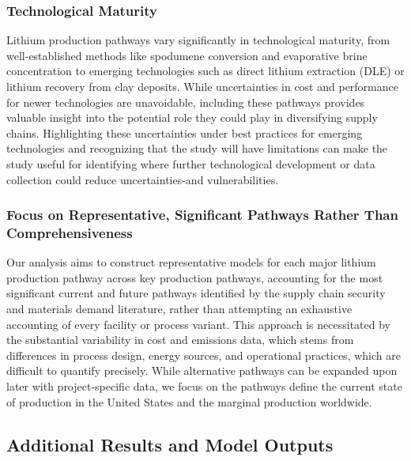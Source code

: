 \documentclass{article}
\renewcommand\_{\textunderscore\allowbreak}
\begin{document}
\subsubsection{Technological Maturity}\label{app:04-limitations-maturity}

Lithium production pathways vary significantly in technological maturity, from well-established methods like spodumene conversion and evaporative brine concentration to emerging technologies such as direct lithium extraction (DLE) or lithium recovery from clay deposits. While uncertainties in cost and performance for newer technologies are unavoidable, including these pathways provides valuable insight into the potential role they could play in diversifying supply chains. Highlighting these uncertainties under best practices for emerging technologies \cite{woods-robinsonControversyConsensusCommon2025, bredehoeft47R11CostEstimate2020} and recognizing that the study will have limitations can make the study useful for identifying where further technological development or data collection could reduce uncertainties-and vulnerabilities.

\subsubsection{Focus on Representative, Significant Pathways Rather Than Comprehensiveness}\label{app:04-limitations-representative}

Our analysis aims to construct representative models for each major lithium production pathway across key production pathways, accounting for the most significant current and future pathways identified by the supply chain security and materials demand literature, rather than attempting an exhaustive accounting of every facility or process variant. This approach is necessitated by the substantial variability in cost and emissions data, which stems from differences in process design, energy sources, and operational practices, which are difficult to quantify precisely. While alternative pathways can be expanded upon later with project-specific data, we focus on the pathways define the current state of production in the United States and the marginal production worldwide. 

\clearpage
\subsection{Additional Results and Model Outputs}\label{app:04-moreresults}
\end{document}
